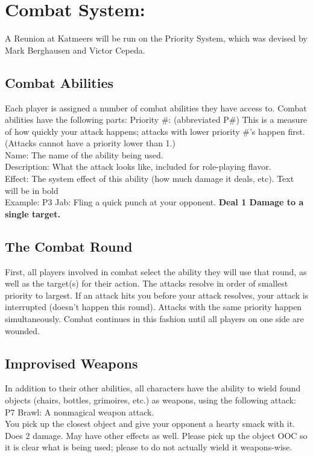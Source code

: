 \documentclass[blue]{Katmeers}
\begin{document}
\name{\bRules{}}


\section{Combat System:}

A Reunion at Katmeers will be run on the Priority System, which was devised by Mark Berghausen and Victor Cepeda.

\subsection*{Combat Abilities}
Each player is assigned a number of combat abilities they have access to. Combat abilities have the following parts:
Priority \#: (abbreviated P\#) This is a measure of how quickly your attack happens; attacks with lower priority \#'s happen first. (Attacks cannot have a priority lower than 1.)\\
\indent Name: The name of the ability being used.\\
\indent Description: What the attack looks like, included for role-playing flavor.\\
\indent Effect: The system effect of this ability (how much damage it deals, etc). Text will be in bold\\
\indent Example: P3 Jab: Fling a quick punch at your opponent. {\bf Deal 1 Damage to a single target.}

\subsection*{The Combat Round}
First, all players involved in combat select the ability they will use that round, as well as the target(s) for their action. The attacks resolve in order of smallest priority to largest. If an attack hits you before your attack resolves, your attack is interrupted (doesn't happen this round). Attacks with the same priority happen simultaneously. Combat continues in this fashion until all players on one side are wounded.

\subsection*{Improvised Weapons}
In addition to their other abilities, all characters have the ability to wield found objects (chairs, bottles, grimoires, etc.) as weapons, using the following attack:\\
P7 Brawl: A nonmagical weapon attack.\\
You pick up the closest object and give your opponent a hearty smack with it. Does 2 damage.  May have other effects as well.  Please pick up the object OOC so it is clear what is being used; please to do not actually wield it weapons-wise.
\end{document}
